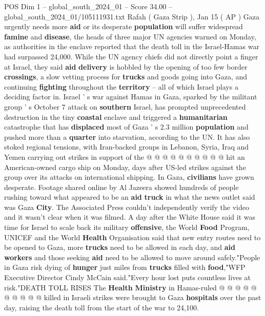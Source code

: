 \begin{textsample}{POS Dim 1 – global\_south\_2024\_01 – Score 34.00 – global\_south\_2024\_01/105111931.txt}  \label{ex:f1_pos_118}
Rafah ( Gaza Strip ), Jan 15 ( AP ) Gaza urgently needs more \textbf{aid} or its desperate \textbf{population} will suffer widespread \textbf{famine} and \textbf{disease}, the heads of three major UN agencies warned on Monday, as authorities in the enclave reported that the death toll in the Israel-Hamas war had surpassed 24,000.
While the UN agency chiefs did not directly point a finger at Israel, they said \textbf{aid} \textbf{delivery} is hobbled by the opening of too few border \textbf{crossings}, a slow vetting process for \textbf{trucks} and goods going into Gaza, and continuing \textbf{fighting} throughout the \textbf{territory} -- all of which Israel plays a deciding factor in.
Israel ' s war against Hamas in Gaza, sparked by the militant group ' s October 7 attack on \textbf{southern} Israel, has prompted unprecedented destruction in the tiny \textbf{coastal} enclave and triggered a \textbf{humanitarian} catastrophe that has \textbf{displaced} most of Gaza ' s 2.3 million \textbf{population} and pushed more than a \textbf{quarter} into starvation, according to the UN.
It has also stoked regional tensions, with Iran-backed groups in Lebanon, Syria, Iraq and Yemen carrying out strikes in support of the @ @ @ @ @ @ @ @ @ @ hit an American-owned cargo ship on Monday, days after US-led strikes against the group over its attacks on international shipping.
In Gaza, \textbf{civilians} have grown desperate.
Footage shared online by Al Jazeera showed hundreds of people rushing toward what appeared to be an \textbf{aid} \textbf{truck} in what the news outlet said was Gaza \textbf{City}.
The Associated Press couldn't independently verify the video and it wasn't clear when it was filmed.
A day after the White House said it was time for Israel to scale back its military \textbf{offensive}, the World \textbf{Food} Program, UNICEF and the World \textbf{Health} Organisation said that new entry routes need to be opened to Gaza, more \textbf{trucks} need to be allowed in each day, and \textbf{aid} \textbf{workers} and those seeking \textbf{aid} need to be allowed to move around safely."People in Gaza risk dying of \textbf{hunger} just miles from \textbf{trucks} filled with \textbf{food},"WFP Executive Director Cindy McCain said."Every hour lost puts countless lives at risk."DEATH TOLL RISES The \textbf{Health} \textbf{Ministry} in Hamas-ruled @ @ @ @ @ @ @ @ @ @ killed in Israeli strikes were brought to Gaza \textbf{hospitals} over the past day, raising the death toll from the start of the war to 24,100.

\end{textsample}

